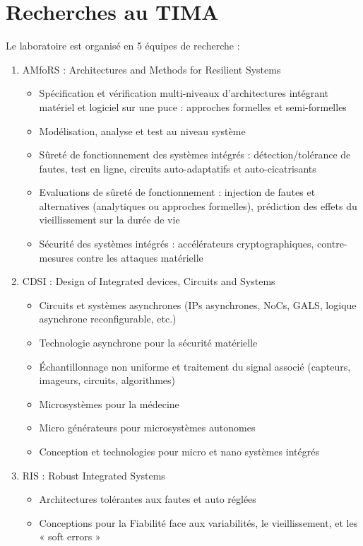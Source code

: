 \section{Recherches au TIMA}
Le laboratoire est organisé en 5 équipes de recherche :
\begin{enumerate}
\item AMfoRS : Architectures and Methods for Resilient Systems
\begin{itemize}
	\item Spécification et vérification multi-niveaux d'architectures intégrant matériel et logiciel sur une puce : approches formelles et semi-formelles
	\item Modélisation, analyse et test au niveau système
	\item Sûreté de fonctionnement des systèmes intégrés : détection/tolérance de fautes, test en ligne, circuits auto-adaptatifs et auto-cicatrisants
	\item Evaluations de sûreté de fonctionnement : injection de fautes et alternatives (analytiques ou approches formelles), prédiction des effets du vieillissement sur la durée de vie
	\item Sécurité des systèmes intégrés : accélérateurs cryptographiques, contre-mesures contre les attaques matérielle
\end{itemize}
\item CDSI : Design of Integrated devices, Circuits and Systems
\begin{itemize}
	\item Circuits et systèmes asynchrones (IPs asynchrones, NoCs, GALS, logique asynchrone reconfigurable, etc.)
	\item Technologie asynchrone pour la sécurité matérielle
	\item Échantillonnage non uniforme et traitement du signal associé (capteurs, imageurs, circuits, algorithmes)
	\item Microsystèmes pour la médecine
	\item Micro générateurs pour microsystèmes autonomes
	\item Conception et technologies pour micro et nano systèmes intégrés
\end{itemize}
\item RIS : Robust Integrated Systems
\begin{itemize}
	\item Architectures tolérantes aux fautes et auto réglées
	\item Conceptions pour la Fiabilité face aux variabilités, le vieillissement, et les « soft errors »

\end{itemize}
\end{enumerate}
